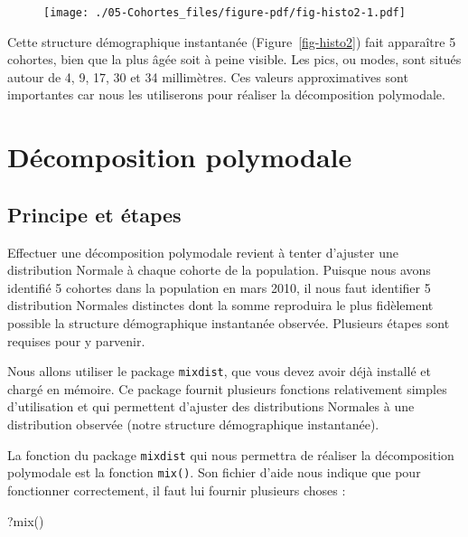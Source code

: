 \documentclass[
  a4paper,
  DIV=11,
  numbers=noendperiod,
  oneside]{scrreprt}
\newenvironment{Shaded}{}{}
\newcommand{\FunctionTok}[1]{\textcolor[rgb]{0.44,0.26,0.76}{#1}}
\newcommand{\NormalTok}[1]{\textcolor[rgb]{0.14,0.16,0.18}{#1}}
\begin{document}
\begin{figure}[H]


{\centering \texttt{[image: ./05-Cohortes\_files/figure-pdf/fig-histo2-1.pdf]}

}

\end{figure}

Cette structure démographique instantanée (Figure~\ref{fig-histo2}) fait
apparaître 5 cohortes, bien que la plus âgée soit à peine visible. Les
pics, ou modes, sont situés autour de 4, 9, 17, 30 et 34 millimètres.
Ces valeurs approximatives sont importantes car nous les utiliserons
pour réaliser la décomposition polymodale.

\hypertarget{duxe9composition-polymodale}{%
\section{Décomposition polymodale}\label{duxe9composition-polymodale}}

\hypertarget{principe-et-uxe9tapes}{%
\subsection{Principe et étapes}\label{principe-et-uxe9tapes}}

Effectuer une décomposition polymodale revient à tenter d'ajuster une
distribution Normale à chaque cohorte de la population. Puisque nous
avons identifié 5 cohortes dans la population en mars 2010, il nous faut
identifier 5 distribution Normales distinctes dont la somme reproduira
le plus fidèlement possible la structure démographique instantanée
observée. Plusieurs étapes sont requises pour y parvenir.

Nous allons utiliser le package \texttt{mixdist}, que vous devez avoir
déjà installé et chargé en mémoire. Ce package fournit plusieurs
fonctions relativement simples d'utilisation et qui permettent d'ajuster
des distributions Normales à une distribution observée (notre structure
démographique instantanée).

La fonction du package \texttt{mixdist} qui nous permettra de réaliser
la décomposition polymodale est la fonction \texttt{mix()}. Son fichier
d'aide nous indique que pour fonctionner correctement, il faut lui
fournir plusieurs choses :

\begin{Shaded}
\begin{Highlighting}[]
\NormalTok{?}\FunctionTok{mix}\NormalTok{()}
\end{Highlighting}
\end{Shaded}
\end{document}

